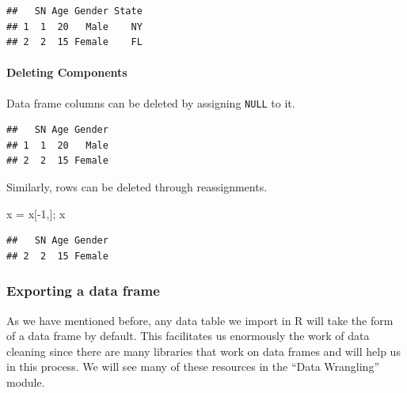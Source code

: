\documentclass[
]{book}
\newenvironment{Shaded}{\begin{snugshade}}{\end{snugshade}}
\newcommand{\ConstantTok}[1]{\textcolor[rgb]{0.00,0.00,0.00}{#1}}
\newcommand{\DecValTok}[1]{\textcolor[rgb]{0.00,0.00,0.81}{#1}}
\newcommand{\FunctionTok}[1]{\textcolor[rgb]{0.00,0.00,0.00}{#1}}
\newcommand{\NormalTok}[1]{#1}
\newcommand{\OtherTok}[1]{\textcolor[rgb]{0.56,0.35,0.01}{#1}}
\newcommand{\SpecialCharTok}[1]{\textcolor[rgb]{0.00,0.00,0.00}{#1}}
\newcommand{\StringTok}[1]{\textcolor[rgb]{0.31,0.60,0.02}{#1}}
\theoremstyle{definition}
\theoremstyle{definition}
\theoremstyle{definition}
\theoremstyle{definition}
\theoremstyle{remark}
\begin{document}
\begin{Shaded}
\end{Shaded}

\begin{verbatim}
##   SN Age Gender State
## 1  1  20   Male    NY
## 2  2  15 Female    FL
\end{verbatim}

\hypertarget{deleting-components}{%
\paragraph{Deleting Components}\label{deleting-components}}

Data frame columns can be deleted by assigning \texttt{NULL} to it.

\begin{Shaded}
\end{Shaded}

\begin{verbatim}
##   SN Age Gender
## 1  1  20   Male
## 2  2  15 Female
\end{verbatim}

Similarly, rows can be deleted through reassignments.

\begin{Shaded}
\begin{Highlighting}[]
\NormalTok{x }\OtherTok{=}\NormalTok{ x[}\SpecialCharTok{{-}}\DecValTok{1}\NormalTok{,]; x}
\end{Highlighting}
\end{Shaded}

\begin{verbatim}
##   SN Age Gender
## 2  2  15 Female
\end{verbatim}

\hypertarget{exporting-a-data-frame}{%
\subsubsection{Exporting a data frame}\label{exporting-a-data-frame}}

As we have mentioned before, any data table we import in R will take the form of a data frame by default. This facilitates us enormously the work of data cleaning since there are many libraries that work on data frames and will help us in this process. We will see many of these resources in the ``Data Wrangling'' module.
\end{document}
